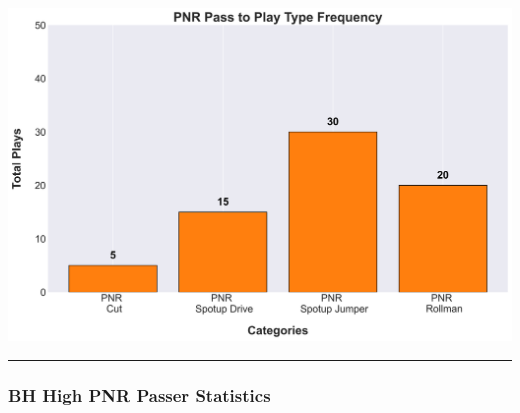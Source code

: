\documentclass[a4paper,12pt]{article}
\begin{document}
\begin{table}[H]
{\begin{minipage}[t]{0.6\textwidth}
{\begin{tabular}
            
                
            
                
            
                
            
                
            
                
            
                
            
                
            
                
            
                
            
                
            

            \bottomrule
        \end{tabular}
        }
    \end{minipage}
    }
    \hfill %
    \begin{minipage}[c]{0.35\textwidth} %
        \flushright
        \includegraphics[width=\textwidth, height=.14\textheight]{images/PNR_PassPlayType_Freq.png} %
    \end{minipage}
\end{table}

\vspace{-1em} %
\hrule height 1pt width 1\textwidth %
\vspace{1em} %

\subsubsection{BH High PNR Passer Statistics}
\end{document}
